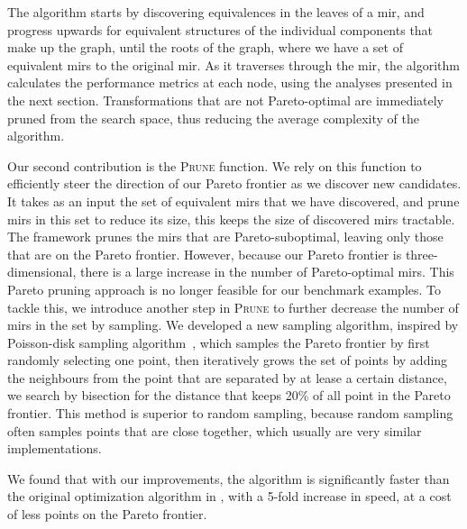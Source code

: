 The algorithm starts by discovering equivalences in the leaves of a \gls{mir},
and progress upwards for equivalent structures of the individual components
that make up the graph, until the roots of the graph, where we have a set of
equivalent \glspl{mir} to the original \gls{mir}\@.  As it traverses through
the \gls{mir}, the algorithm calculates the performance metrics at each node,
using the analyses presented in the next section.  Transformations that are not
Pareto-optimal are immediately pruned from the search space, thus reducing the
average complexity of the algorithm.

Our second contribution is the \textsc{Prune} function.  We rely on this
function to efficiently steer the direction of our Pareto frontier as
we discover new candidates.  It takes as an input the set of equivalent
\glspl{mir} that we have discovered, and prune \glspl{mir} in this set to
reduce its size, this keeps the size of discovered \glspl{mir} tractable.  The
\soap{} framework prunes the \glspl{mir} that are Pareto-suboptimal, leaving
only those that are on the Pareto frontier.  However, because our Pareto
frontier is three-dimensional, there is a large increase in the number of
Pareto-optimal \glspl{mir}.  This Pareto pruning approach is no longer feasible
for our benchmark examples.  To tackle this, we introduce another step in
\textsc{Prune} to further decrease the number of \glspl{mir} in the set by
sampling.  We developed a new sampling algorithm, inspired by Poisson-disk
sampling algorithm~\cite{bridson07}, which samples the Pareto frontier by first
randomly selecting one point, then iteratively grows the set of points by
adding the neighbours from the point that are separated by at lease a certain
distance, we search by bisection for the distance that keeps 20\% of all point
in the Pareto frontier.  This method is superior to random sampling, because
random sampling often samples points that are close together, which usually are
very similar implementations.

We found that with our improvements, the algorithm is significantly faster than
the original optimization algorithm in \soap, with a 5-fold increase in speed,
at a cost of less points on the Pareto frontier.


